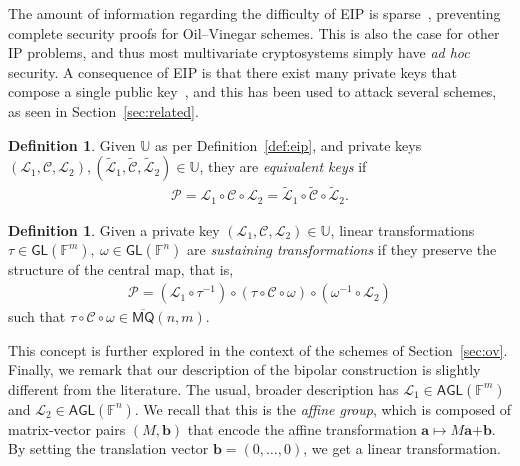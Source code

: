 \documentclass[english]{ufsc-thesis-rn46-2019/ufsc-thesis-rn46-2019}
\theoremstyle{definition}
\newtheorem{definition}[theorem]{Definition}
\begin{document}
The amount of information regarding the difficulty of EIP is
sparse~\cite[p.~69]{Thomae:201306}, preventing complete security proofs for
Oil--Vinegar schemes. This is also the case for other IP problems, and thus
most multivariate cryptosystems simply have \emph{ad hoc}
security. A consequence of EIP is that there exist many private keys that
compose a single public key~\cite{Wolf:201104}, and this has been used to
attack several schemes, as seen in Section~\ref{sec:related}.

\begin{definition}
  Given $\mathbb{U}$ as per Definition~\ref{def:eip}, and private keys
  $(\mathcal{L}_{1}, \mathcal{C}, \mathcal{L}_{2}),
    (\widetilde{\mathcal{L}}_{1}, \widetilde{\mathcal{C}},
      \widetilde{\mathcal{L}}_{2}) \in \mathbb{U}$,
  they are \emph{equivalent keys} if
  \begin{align}
    \mathcal{P} = \mathcal{L}_{1} \circ \mathcal{C} \circ \mathcal{L}_{2}
      = \widetilde{\mathcal{L}}_{1} \circ \widetilde{\mathcal{C}}
        \circ \widetilde{\mathcal{L}}_{2}.
  \end{align}
\end{definition}

\begin{definition}\label{def:sustainer}
  Given a private key
  $(\mathcal{L}_{1}, \mathcal{C}, \mathcal{L}_{2}) \in \mathbb{U}$, linear
  transformations
  $\tau \in \mathsf{GL}(\mathbb{F}^{m}),\:
    \omega \in \mathsf{GL}(\mathbb{F}^{n})$
  are \emph{sustaining transformations} if they preserve the structure of the
  central map, that is,
  \begin{align}
    \mathcal{P} = (\mathcal{L}_{1} \circ \tau^{-1})
      \circ (\tau \circ \mathcal{C} \circ \omega)
      \circ (\omega^{-1} \circ \mathcal{L}_{2})
  \end{align}
  such that
  $\tau \circ \mathcal{C} \circ \omega \in \overline{\mathsf{MQ}}(n, m)$.
\end{definition}

This concept is further explored in the context of the schemes of
Section~\ref{sec:ov}. Finally, we remark that our description of the bipolar
construction is slightly different from the literature. The usual, broader
description has $\mathcal{L}_{1} \in \mathsf{AGL}(\mathbb{F}^{m})$ and
$\mathcal{L}_{2} \in \mathsf{AGL}(\mathbb{F}^{n})$. We recall that this is the
\emph{affine group}, which is composed of matrix-vector pairs $(M, \mathbf{b})$
that encode the affine transformation
$\mathbf{a} \mapsto M\mathbf{a} \bm{+} \mathbf{b}$. By setting the translation
vector $\mathbf{b} = (0, \dots, 0)$, we get a linear transformation.
\end{document}
